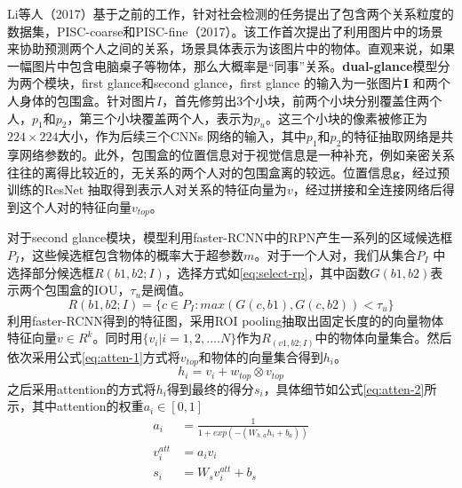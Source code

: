 Li等人（2017）\cite{li2017dual-glance}基于之前的工作，针对社会检测的任务提出了包含两个关系粒度的数据集，PISC-coarse和PISC-fine（2017）\cite{li2017dual-glance}。该工作首次提出了利用图片中的场景来协助预测两个人之间的关系，场景具体表示为该图片中的物体。直观来说，如果一幅图片中包含电脑桌子等物体，那么大概率是``同事''关系。\textbf{dual-glance}模型分为两个模块，first glance和second glance，first glance 的输入为一张图片$\mathbf{I}$ 和两个人身体的包围盒。针对图片$I$，首先修剪出3个小块，前两个小块分别覆盖住两个人，$p_1$和$p_2$，第三个小块覆盖两个人，表示为$p_{u}$。这三个小块的像素被修正为$224 \times 224$大小，作为后续三个CNNs 网络的输入，其中$p_1$和$p_2$的特征抽取网络是共享网络参数的。此外，包围盒的位置信息对于视觉信息是一种补充，例如亲密关系往往的离得比较近的，无关系的两个人对的包围盒离的较远。位置信息$\mathbf{g}$，经过预训练的ResNet\cite{he2016deep} 抽取得到表示人对关系的特征向量为$v$，经过拼接和全连接网络后得到这个人对的特征向量$v_{top}$。

对于second glance模块，模型利用faster-RCNN\cite{ren2015faster}中的RPN产生一系列的区域候选框$P_{I}$，这些候选框包含物体的概率大于超参数$m$。对于一个人对，我们从集合$P_{I}$ 中选择部分候选框$R(b1,b2;I)$，选择方式如\ref{eq:select-rp}，其中函数$G(b1,b2)$表示两个包围盒的IOU，$\tau_{u}$是阀值。
\begin{equation}\label{eq:select-rp}
    R(b1,b2;I) = \{c \in P_{I} : max(G(c,b1),G(c,b2))<\tau_{u}\}
\end{equation}
利用faster-RCNN得到的特征图，采用ROI pooling抽取出固定长度的的向量物体特征向量$v \in R^{k}$。同时用$\{v_i|i=1, 2, .... N\}$作为$R_(v1,b2;I)$中的物体向量集合。然后依次采用公式\ref{eq:atten-1}方式将$v_{top}$和物体的向量集合得到$h_i$。
\begin{equation}\label{eq:atten-1}
    h_i = v_i + w_{top} \otimes v_{top}
\end{equation}
之后采用attention的方式将$h_i$得到最终的得分$s_i$，具体细节如公式\ref{eq:atten-2}所示，其中attention的权重$a_{i} \in [0,1]$
\begin{equation} \label{eq:atten-2}
    \begin{split}
        a_{i} &= \frac{1}{1+exp(-(W_{h,a}h_{i}+b_{a}))} \\
        v^{att}_{i} &= a_{i}v_{i} \\
        s_{i} &= W_{s} v_{i}^{att} + b_{s}
    \end{split}
\end{equation}

